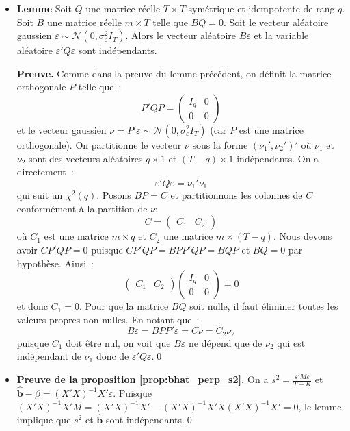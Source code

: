 \documentclass[10pt]{beamer}
\theoremstyle{plain}
\begin{document}
\begin{notes}

  \begin{itemize}

  \item \textbf{Lemme}
    Soit $Q$ une matrice réelle $T\times T$ symétrique et idempotente de rang $q$. Soit $B$ une matrice réelle $m\times T$ telle que $BQ=0$. Soit le vecteur aléatoire gaussien $\varepsilon\sim\mathcal N(0, \sigma_{\varepsilon}^2I_T)$. Alors le vecteur aléatoire $B\varepsilon$ et la variable aléatoire $\varepsilon' Q \varepsilon$ sont indépendants.\newline

    \textbf{Preuve.} Comme dans la preuve du lemme précédent, on définit la matrice orthogonale $P$ telle que~:
    \[
      P'QP =
      \begin{pmatrix}
        I_q & 0\\
        0   & 0
      \end{pmatrix}
    \]
    et le vecteur gaussien $\nu = P'\varepsilon\sim\mathcal N\left(0, \sigma_{\varepsilon}^2I_T\right)$ (car $P$ est une matrice orthogonale). On partitionne le vecteur $\nu$ sous la forme $(\nu_1',\nu_2')'$ où $\nu_1$ et $\nu_2$ sont des vecteurs aléatoires $q\times 1$ et $(T-q)\times 1$ indépendants. On a directement~:
    \[
      \varepsilon' Q \varepsilon = \nu_1'\nu_1
    \]
    qui suit un $\chi^2(q)$. Posons $BP = C$ et partitionnons les colonnes de $C$ conformément à la partition de $\nu$:
    \[
      C =
      \begin{pmatrix}
        C_1 & C_2
      \end{pmatrix}
    \]
    où $C_1$ est une matrice $m\times q$ et $C_2$ une matrice $m\times(T-q)$. Nous devons avoir $C P' Q P = 0$ puisque $CP'QP = BPP'QP = BQP$ et $BQ = 0$ par hypothèse. Ainsi~:
    \[
      \begin{pmatrix}
        C_1 & C_2
      \end{pmatrix}
      \begin{pmatrix}
        I_q & 0\\
        0   & 0
      \end{pmatrix}
      = 0
    \]
    et donc $C_1=0$. Pour que la matrice $BQ$ soit nulle, il faut éliminer toutes les valeurs propres non nulles. En notant que~:
    \[
      B\varepsilon = BPP'\varepsilon = C\nu = C_2\nu_2
    \]
    puisque $C_1$ doit être nul, on voit que $B\varepsilon$ ne dépend que de $\nu_2$ qui est indépendant de $\nu_1$ donc de $\varepsilon' Q \varepsilon$.\qed\newline

  \item \textbf{Preuve de la proposition \ref{prop:bhat_perp_s2}.} On
    a $s^2=\frac{\varepsilon' M \varepsilon}{T-K}$
    et
    $\hat{\mathbf b}-\beta = (X'X)^{-1}X'\varepsilon$. Puisque
    $(X'X)^{-1}X'M = (X'X)^{-1}X'-(X'X)^{-1}X'X(X'X)^{-1}X'=0$, le
    lemme implique que $s^2$ et $\hat{\mathbf b}$ sont indépendants.\qed


  \end{itemize}

\end{notes}
\end{document}
